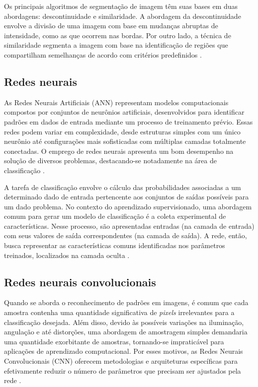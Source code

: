 Os principais algoritmos de segmentação de imagem têm suas bases em duas 
abordagens: descontinuidade e similaridade. A abordagem da descontinuidade 
envolve a divisão de uma imagem com base em mudanças abruptas de 
intensidade, como as que ocorrem nas bordas. Por outro lado, a técnica 
de similaridade segmenta a imagem com base na identificação de regiões 
que compartilham semelhanças de acordo com critérios 
predefinidos \cite[p. 6]{gonzalez2010}.

\subsection{Redes neurais}\label{subsec:redes}

As Redes Neurais Artificiais (ANN) representam modelos computacionais 
compostos por conjuntos de neurônios artificiais, desenvolvidos para 
identificar padrões em dados de entrada mediante um processo de treinamento 
prévio. Essas redes podem variar em complexidade, desde estruturas simples 
com um único neurônio até configurações mais sofisticadas com múltiplas 
camadas totalmente conectadas. O emprego de redes neurais apresenta um 
bom desempenho na solução de diversos problemas, destacando-se 
notadamente na área de classificação \cite[p. 19]{italo2021}.

A tarefa de classificação envolve o cálculo das probabilidades associadas 
a um determinado dado de entrada pertencente aos conjuntos de saídas 
possíveis para um dado problema. No contexto do aprendizado supervisionado, 
uma abordagem comum para gerar um modelo de classificação é a coleta 
experimental de características. Nesse processo, são apresentadas entradas 
(na camada de entrada) com seus valores de saída correspondentes 
(na camada de saída). A rede, então, busca representar as características 
comuns identificadas nos parâmetros treinados, localizados na camada 
oculta \cite[p. 19]{italo2021}.

\subsection{Redes neurais convolucionais}\label{subsec:convolucionais}

Quando se aborda o reconhecimento de padrões em imagens, é comum que cada 
amostra contenha uma quantidade significativa de \textit{pixels} irrelevantes para 
a classificação desejada. Além disso, devido às possíveis variações na 
iluminação, angulação e até distorções, uma abordagem de amostragem 
simples demandaria uma quantidade exorbitante de amostras, tornando-se 
impraticável para aplicações de aprendizado computacional. Por esses 
motivos, as Redes Neurais Convolucionais (CNN) oferecem metodologias 
e arquiteturas específicas para efetivamente reduzir o número de 
parâmetros que precisam ser ajustados pela rede \cite[p. 22]{italo2021}.

